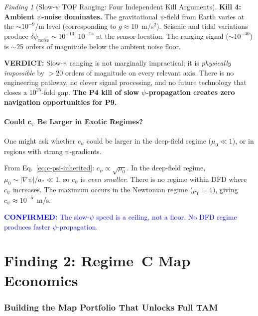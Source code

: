 \documentclass[11pt]{article}
\theoremstyle{definition}
\theoremstyle{remark}
\newtheorem{finding}[theorem]{Finding}
\newcommand{\confirmed}[1]{\textcolor{blue}{\textbf{CONFIRMED:} #1}}
\newcommand{\verdict}[1]{\textcolor{green!50!black}{\textbf{VERDICT:} #1}}
\begin{document}
\begin{finding}[Slow-$\psi$ TOF Ranging: Four Independent Kill Arguments]
\textbf{Kill 4: Ambient $\psi$-noise dominates.}
The gravitational $\psi$-field from Earth varies at the
$\sim$$10^{-9}$/m level (corresponding to $g \approx 10$~m/s$^2$).
Seismic and tidal variations produce $\delta\psi_{\mathrm{noise}}
\sim 10^{-13}$--$10^{-15}$ at the sensor location. The ranging
signal ($\sim 10^{-40}$) is $\sim$25 orders of magnitude below
the ambient noise floor.

\verdict{Slow-$\psi$ ranging is not marginally impractical; it is
\emph{physically impossible} by $>$20 orders of magnitude on every
relevant axis. There is no engineering pathway, no clever signal
processing, and no future technology that closes a $10^{25}$-fold
gap. \textbf{The P4 kill of slow $\psi$-propagation creates zero
navigation opportunities for P9.}}
\end{finding}

\subsection{Could c$_\psi$ Be Larger in Exotic Regimes?}

One might ask whether $c_\psi$ could be larger in the deep-field
regime ($\mu_0 \ll 1$), or in regions with strong $\psi$-gradients.

From Eq.~\eqref{eq:c-psi-inherited}: $c_\psi \propto \sqrt{\mu_0}$.
In the deep-field regime, $\mu_0 \sim |\nabla\psi|/a_* \ll 1$,
so $c_\psi$ is \emph{even smaller}. There is no regime within
DFD where $c_\psi$ increases. The maximum occurs in the Newtonian
regime ($\mu_0 = 1$), giving $c_\psi \approx 10^{-5}$~m/s.

\confirmed{The slow-$\psi$ speed is a ceiling, not a floor.
No DFD regime produces faster $\psi$-propagation.}

\part{Finding 2: Regime~C Map Economics}
\label{part:regime-c-economics}

\section{Building the Map Portfolio That Unlocks Full TAM}
\label{sec:map-economics}
\end{document}
